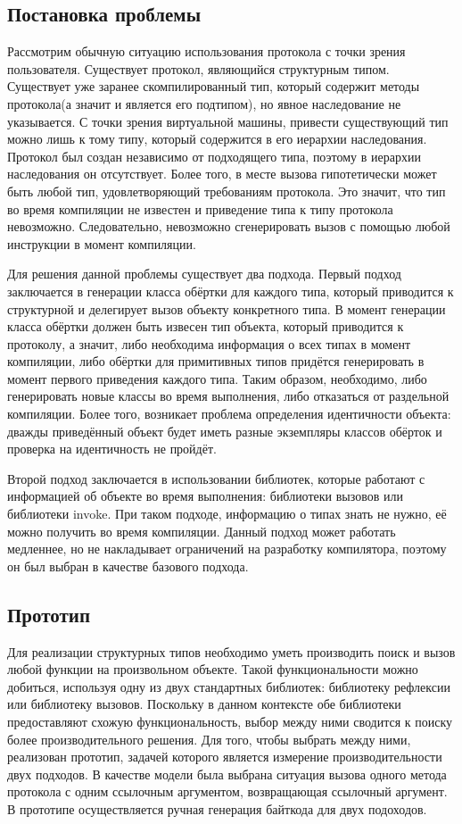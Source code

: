 
\subsection{Постановка проблемы}

Рассмотрим обычную ситуацию использования протокола с точки зрения пользователя. Существует протокол, являющийся структурным типом. Существует уже заранее скомпилированный тип, который содержит методы протокола(а значит и является его подтипом), но явное наследование не указывается. С точки зрения виртуальной машины, привести существующий тип можно лишь к тому типу, который содержится в его иерархии наследования. Протокол был создан независимо от подходящего типа, поэтому в иерархии наследования он отсутствует. Более того, в месте вызова гипотетически может быть любой тип, удовлетворяющий требованиям протокола. Это значит, что тип во время компиляции не известен и приведение типа к типу протокола невозможно. Следовательно, невозможно сгенерировать вызов с помощью любой инструкции в момент компиляции.

Для решения данной проблемы существует два подхода. Первый подход заключается в генерации класса обёртки для каждого типа, который приводится к структурной и делегирует вызов объекту конкретного типа. В момент генерации класса обёртки должен быть извесен тип объекта, который приводится к протоколу, а значит, либо необходима информация о всех типах в момент компиляции, либо обёртки для примитивных типов придётся генерировать в момент первого приведения каждого типа. Таким образом, необходимо, либо генерировать новые классы во время выполнения, либо отказаться от раздельной компиляции. Более того, возникает проблема определения идентичности объекта: дважды приведённый объект будет иметь разные экземпляры классов обёрток и проверка на идентичность не пройдёт.

Второй подход заключается в использовании библиотек, которые работают с информацией об объекте во время выполнения: библиотеки вызовов или библиотеки invoke. При таком подходе, информацию о типах знать не нужно, её можно получить во время компиляции. Данный подход может работать медленнее, но не накладывает ограничений на разработку компилятора, поэтому он был выбран в качестве базового подхода.

\subsection{Прототип}
Для реализации структурных типов необходимо уметь производить поиск и вызов любой функции на произвольном объекте. Такой функциональности можно добиться, используя одну из двух стандартных библиотек: библиотеку рефлексии или библиотеку вызовов. Поскольку в данном контексте обе библиотеки предоставляют схожую функциональность, выбор между ними сводится к поиску более производительного решения. Для того, чтобы выбрать между ними, реализован прототип, задачей которого является измерение производительности двух подходов. В качестве модели была выбрана ситуация вызова одного метода протокола с одним ссылочным аргументом, возвращающая ссылочный аргумент. В прототипе осуществляется ручная генерация байткода для двух подоходов.

